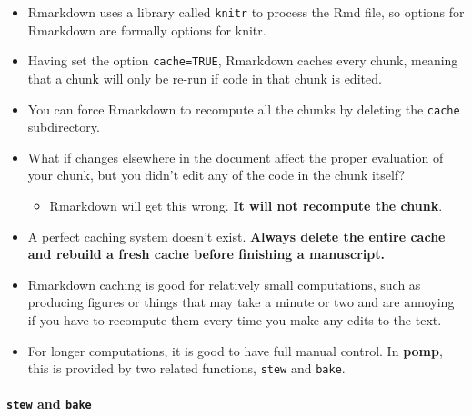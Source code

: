 \documentclass[]{article}
\providecommand{\tightlist}{%
  \setlength{\itemsep}{0pt}\setlength{\parskip}{0pt}}
\let\oldparagraph\paragraph
\renewcommand{\paragraph}[1]{\oldparagraph{#1}\mbox{}}
\begin{document}
\begin{itemize}
\item
  Rmarkdown uses a library called \texttt{knitr} to process the Rmd
  file, so options for Rmarkdown are formally options for knitr.
\item
  Having set the option \texttt{cache=TRUE}, Rmarkdown caches every
  chunk, meaning that a chunk will only be re-run if code in that chunk
  is edited.
\item
  You can force Rmarkdown to recompute all the chunks by deleting the
  \texttt{cache} subdirectory.
\item
  What if changes elsewhere in the document affect the proper evaluation
  of your chunk, but you didn't edit any of the code in the chunk
  itself?

  \begin{itemize}
  \tightlist
  \item
    Rmarkdown will get this wrong. \textbf{It will not recompute the
    chunk}.
  \end{itemize}
\item
  A perfect caching system doesn't exist. \textbf{Always delete the
  entire cache and rebuild a fresh cache before finishing a manuscript.}
\item
  Rmarkdown caching is good for relatively small computations, such as
  producing figures or things that may take a minute or two and are
  annoying if you have to recompute them every time you make any edits
  to the text.
\item
  For longer computations, it is good to have full manual control. In
  \textbf{pomp}, this is provided by two related functions,
  \texttt{stew} and \texttt{bake}.
\end{itemize}

\paragraph{\texorpdfstring{\texttt{stew} and
\texttt{bake}}{stew and bake}}\label{stew-and-bake}
\end{document}
